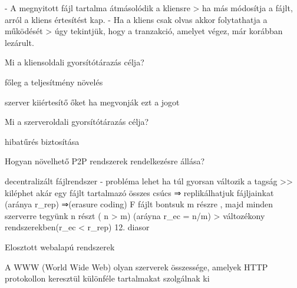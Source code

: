 \documentclass[12pt]{article}
\begin{document}
\begin{description}
                                                                        - A megnyitott fájl tartalma átmásolódik a kliensre
                                                                        > ha más módosítja a fájlt, arról a kliens értesítést kap.
                                                                        - Ha a kliens csak olvas akkor folytathatja a működését 
                                                                        > úgy tekintjük, hogy a tranzakció, amelyet végez, már korábban lezárult.	
                                                                    \item  Mi a kliensoldali gyorsítótárazás célja?
                                                                    \item főleg a teljesítmény növelés
                                                                    \item szerver kiiértesítő őket ha megvonják ezt a jogot
                                                                    \item  Mi a szerveroldali gyorsítótárazás célja?
                                                                    \item hibatűrés biztosítása
                                                                    \item  Hogyan növelhető P2P rendszerek rendelkezésre állása?
                                                                    \item decentralizált fájlrendszer
                                                                        - probléma lehet ha túl gyorsan változik a tagság >> kiléphet akár egy fájlt tartalmazó összes csúcs
                                                                        ⇒ replikálhatjuk fájljainkat (aránya r\_rep)
                                                                        ⇒(erasure coding) F fájlt bontsuk m részre , majd minden szerverre
                                                                        tegyünk n részt ( n > m) (aráyna r\_ec = n/m) 
                                                                        > változékony rendszerekben(r\_ec < r\_rep)
                                                                        12. diasor
                                                                    \item  Elosztott webalapú rendszerek
                                                                    \item A WWW (World Wide Web) olyan szerverek összessége, amelyek HTTP protokollon keresztül különféle tartalmakat szolgálnak ki

\end{description}
\end{document}
